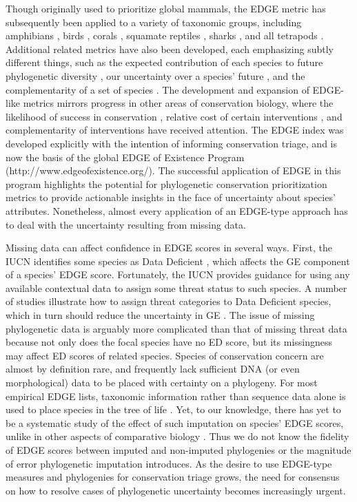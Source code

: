 \documentclass[10pt,english]{article}
\begin{document}
Though originally used to prioritize global mammals, the EDGE metric has
subsequently been applied to a variety of taxonomic groups, including amphibians
\autocite{Isaac2012}, birds \autocite{Jetz2014}, corals \autocite{Curnick2015},
squamate reptiles \autocite{Tonini2016}, sharks \autocite{Stein2018}, and all tetrapods \autocite{Gumbs2018}.
Additional related metrics have also been developed, each emphasizing subtly
different things, such as the expected contribution of each species to future
phylogenetic diversity \autocite[HEDGE, I-HEDGE;][]{Steel2007,Jensen2016}, our
uncertainty over a species' future \autocite[EDAM;][]{Pearse2015}, and the
complementarity of a set of species \autocite{Faith2008}. The development and
expansion of EDGE-like metrics mirrors progress in other areas of conservation
biology, where the likelihood of success in conservation \autocite{Wilson2007,
Mcbride2007}, relative cost of certain interventions \autocite{Naidoo2006}, and
complementarity of interventions \autocite{Pressey1993, Myers2000} have received
attention. The EDGE index was developed explicitly with the intention of
informing conservation triage, and is now the basis of the global EDGE of
Existence Program (http://www.edgeofexistence.org/). The successful application
of EDGE in this program highlights the potential for phylogenetic conservation
prioritization metrics to provide actionable insights in the face of uncertainty
about species' attributes. Nonetheless, almost every application of an EDGE-type
approach has to deal with the uncertainty resulting from missing data.

Missing data can affect confidence in EDGE scores in several ways. First, the
IUCN identifies some species as Data Deficient \autocite{Iucn2001, Iucn2008},
which affects the GE component of a species' EDGE score. Fortunately, the
IUCN provides guidance for using any available contextual data to assign some
threat status to such species. A number of studies illustrate how to assign
threat categories to Data Deficient species, which in turn should reduce the
uncertainty in GE \autocite{Good2006, Butchart2010, Morais2013, Dulvy2014}. The
issue of missing phylogenetic data is arguably more complicated than that of
missing threat data because not only does the focal species have no ED score,
but its missingness may affect ED scores of related species. Species of
conservation concern are almost by definition rare, and frequently lack
sufficient DNA (or even morphological) data to be placed with certainty on a
phylogeny. For most empirical EDGE lists, taxonomic information rather than
sequence data alone is used to place species in the tree of life
\autocite[see][]{Isaac2007, Collen2011, Isaac2012, Jetz2014, Curnick2015,
Stein2018, Gumbs2018}. Yet, to our knowledge, there has yet to be a systematic
study of the effect of such imputation on species' EDGE scores, unlike in other
aspects of comparative biology \autocite{Kuhn2011, Thomas2013, Rabosky2015}.
Thus we do not know the fidelity of EDGE scores between imputed and non-imputed
phylogenies or the magnitude of error phylogenetic imputation introduces. As the
desire to use EDGE-type measures and phylogenies for conservation triage grows,
the need for consensus on how to resolve cases of phylogenetic uncertainty
becomes increasingly urgent.
\end{document}
